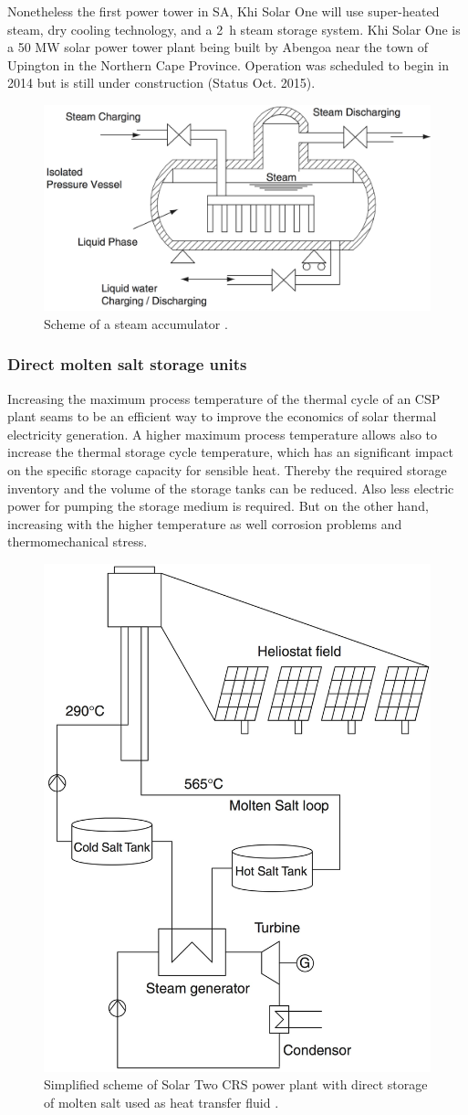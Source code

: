 Nonetheless the first power tower in SA, Khi Solar One will use super-heated steam, dry cooling technology, and a 2~h steam storage system. Khi Solar One is a 50 MW solar power tower plant being built by Abengoa near the town of Upington in the Northern Cape Province. Operation was scheduled to begin in 2014 but is still under construction (Status Oct. 2015). \cite{Abengoa2014,NREL2014}

\begin{figure}[!htbp]  
\centering
\includegraphics[width=0.7\linewidth]{FIG/SteamAccumulatot}
\caption[Scheme of a steam accumulator.]{Scheme of a steam accumulator \cite{Steinmann2006}.}\label{SteamAccumulatot}
\end{figure}
\subsubsection{Direct molten salt storage units}
Increasing the maximum process temperature of the thermal cycle of an CSP plant seams to be an efficient way to improve the economics of solar thermal electricity generation. A higher maximum process temperature allows also to increase the thermal storage cycle temperature, which has an significant impact on the specific storage capacity for sensible heat. Thereby the required storage inventory and the volume of the storage tanks can be reduced. Also less electric power for pumping the storage medium is required. But on the other hand, increasing with the higher temperature as well corrosion problems and thermomechanical stress.
\begin{figure}[t!]  
\centering
\includegraphics[width=0.45\linewidth]{FIG/towerdirecttwotank}
\caption[Simplified scheme of Solar Two CRS power plant with direct storage of molten salt used as heat transfer fluid.]{Simplified scheme of Solar Two CRS power plant with direct storage of molten salt used as heat transfer fluid \cite{Richter2013}.}\label{towerdirecttwotank}
\end{figure}


